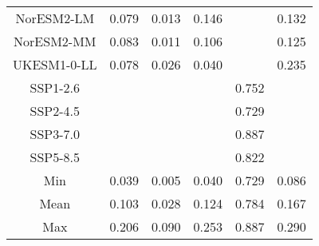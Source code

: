\begin{table*}[t]
\begin{tabular}{c|rrr|rr}
NorESM2-LM & 0.079 & 0.013 & 0.146 &  & 0.132 \\
NorESM2-MM & 0.083 & 0.011 & 0.106 &  & 0.125 \\
UKESM1-0-LL & 0.078 & 0.026 & 0.040 &  & 0.235 \\
SSP1-2.6 &  &  &  & 0.752 &  \\
SSP2-4.5 &  &  &  & 0.729 &  \\
SSP3-7.0 &  &  &  & 0.887 &  \\
SSP5-8.5 &  &  &  & 0.822 &  \\
\midrule
Min & 0.039 & 0.005 & 0.040 & 0.729 & 0.086 \\
Mean & 0.103 & 0.028 & 0.124 & 0.784 & 0.167 \\
Max & 0.206 & 0.090 & 0.253 & 0.887 & 0.290 \\
\bottomrule
\end{tabular}
\end{table*}
